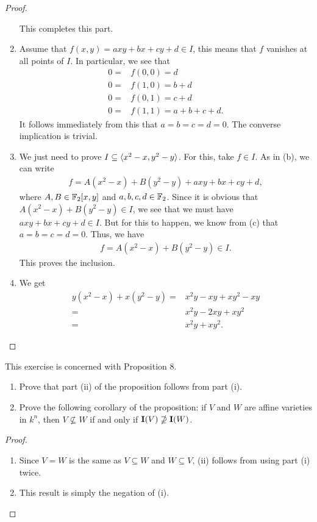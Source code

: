 \begin{proof}
\begin{enumerate}
        This completes this part.
        \item Assume that $f(x,y) = axy + bx + cy + d\in I$, this means that $f$ vanishes at all points of $I$. 
        In particular, we see that
        \begin{align*}
            0 =& f(0,0) = d\\
            0 =& f(1,0) = b+d\\
            0 =& f(0,1) = c+d\\
            0 =& f(1,1) = a+b+c+d.
        \end{align*}
        It follows immediately from this that $a=b=c=d=0$. The converse implication is trivial.
        \item We just need to prove $I\subseteq \langle x^2 - x, y^2 - y\rangle$. 
        For this, take $f\in I$. 
        As in (b), we can write
        \begin{align*}
            f = A(x^2 - x) + B(y^2 - y) + axy + bx + cy + d,
        \end{align*}
        where $A,B\in \mathbb{F}_2[x,y]$ and $a,b,c,d\in \mathbb{F}_2$. 
        Since it is obvious that $A(x^2 -x) + B(y^2 - y)\in I$, we see that we must have $axy + bx + cy + d\in I$. 
        But for this to happen, we know from (c) that $a=b=c=d=0$. 
        Thus, we have
        \begin{align*}
            f = A(x^2 - x) + B(y^2 - y)\in I.
        \end{align*}
        This proves the inclusion.
        \item We get
        \begin{align*}
            y(x^2 - x) + x(y^2 - y)
            =& x^2 y - xy + xy^2 - xy\\
            =& x^2 y - 2xy + xy^2\\
            =& x^2 y + xy^2.
        \end{align*}
    \end{enumerate}
\end{proof}

\begin{exercise}{14}
This exercise is concerned with Proposition 8.
\begin{enumerate}
    \item Prove that part (ii) of the proposition follows from part (i).
    \item Prove the following corollary of the proposition: 
    if $V$ and $W$ are affine varieties in $k^n$, then $V\nsubseteq W$ if and only if $\mathbf{I}(V)\nsupseteq\mathbf{I}(W)$.
\end{enumerate}
\end{exercise}
\begin{proof}
\begin{enumerate}
    \item Since $V=W$ is the same as $V\subseteq W$ and $W\subseteq V$, (ii) follows from using part (i) twice.
    \item This result is simply the negation of (i).
\end{enumerate}
\end{proof}


